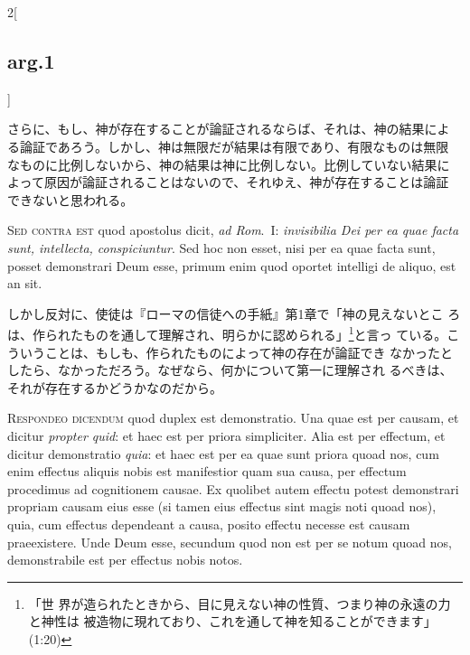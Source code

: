 \documentclass[paper=a4paper,fontsize=10pt,jafontsize=9pt,titlepage]{jlreq}
\begin{document}
\begin{paracol}{2}[\subsection{arg.1}]
\switchcolumn

さらに、もし、神が存在することが論証されるならば、それは、神の結果によ
る論証であろう。しかし、神は無限だが結果は有限であり、有限なものは無限
なものに比例しないから、神の結果は神に比例しない。比例していない結果に
よって原因が論証されることはないので、それゆえ、神が存在することは論証
できないと思われる。

\switchcolumn*[\subsection{s.c.}]

{\scshape Sed contra est} quod apostolus dicit, {\itshape ad Rom}.~I: {\itshape
invisibilia Dei per ea quae facta sunt, intellecta,
conspiciuntur}. Sed hoc non esset, nisi per ea quae facta sunt, posset
demonstrari Deum esse, primum enim quod oportet intelligi de aliquo,
est an sit.

\switchcolumn

しかし反対に、使徒は『ローマの信徒への手紙』第1章で「神の見えないとこ
ろは、作られたものを通して理解され、明らかに認められる」\footnote{「世
界が造られたときから、目に見えない神の性質、つまり神の永遠の力と神性は
被造物に現れており、これを通して神を知ることができます」(1:20)}と言っ
ている。こういうことは、もしも、作られたものによって神の存在が論証でき
なかったとしたら、なかっただろう。なぜなら、何かについて第一に理解され
るべきは、それが存在するかどうかなのだから。


{\scshape Respondeo dicendum} quod duplex est demonstratio. Una quae est
per causam, et dicitur {\itshape propter quid}: et haec est per priora
simpliciter. Alia est per effectum, et dicitur demonstratio {\itshape
quia}: et haec est per ea quae sunt priora quoad nos, cum enim
effectus aliquis nobis est manifestior quam sua causa, per effectum
procedimus ad cognitionem causae. Ex quolibet autem effectu potest
demonstrari propriam causam eius esse (si tamen eius effectus sint
magis noti quoad nos), quia, cum effectus dependeant a causa, posito
effectu necesse est causam praeexistere. Unde Deum esse, secundum quod
non est per se notum quoad nos, demonstrabile est per effectus nobis
notos.

\switchcolumn


\end{paracol}
\end{document}
